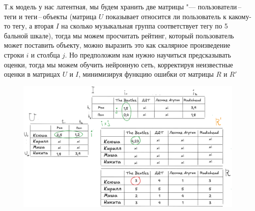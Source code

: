 \documentclass[referat]{SCWorks}
\begin{document}
Т.к модель у нас латентная, мы будем хранить две матрицы "--- пользователи\,--\,теги и теги\,--\,объекты (матрица $U$ показывает 
относится ли пользователь к какому-то тегу, а вторая $I$ на сколько музыкальная группа соответствует тегу по 5 бальной шкале),
тогда мы можем просчитать рейтинг, который пользователь может поставить объекту, можно выразить это как скалярное произведение
строки $i$ и столбца $j$.
Но предположим нам нужно научиться предсказывать оценки, тогда мы можем обучить нейронную сеть, корректируя 
неизвестные оценки в матрицах $U$ и $I$, минимизируя функцию ошибки от матрицы $R$ и $R'$
\begin{figure}[H]
  \centering
  \includegraphics[width=1\textwidth]{./8.png}
  \caption{}
\end{figure}





\end{document}
